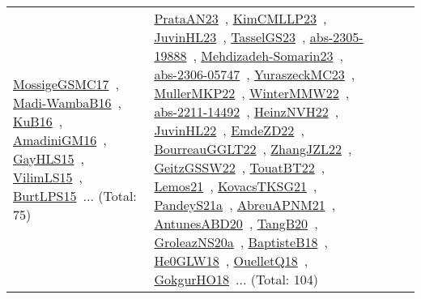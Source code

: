 {\begin{longtable}{lp{3cm}>{\raggedright\arraybackslash}p{6cm}>{\raggedright\arraybackslash}p{6cm}>{\raggedright\arraybackslash}p{8cm}}
\href{works/MossigeGSMC17.pdf}{MossigeGSMC17}~\cite{MossigeGSMC17}, \href{works/Madi-WambaB16.pdf}{Madi-WambaB16}~\cite{Madi-WambaB16}, \href{works/KuB16.pdf}{KuB16}~\cite{KuB16}, \href{works/AmadiniGM16.pdf}{AmadiniGM16}~\cite{AmadiniGM16}, \href{works/GayHLS15.pdf}{GayHLS15}~\cite{GayHLS15}, \href{works/VilimLS15.pdf}{VilimLS15}~\cite{VilimLS15}, \href{works/BurtLPS15.pdf}{BurtLPS15}~\cite{BurtLPS15}... (Total: 75) & \href{works/PrataAN23.pdf}{PrataAN23}~\cite{PrataAN23}, \href{works/KimCMLLP23.pdf}{KimCMLLP23}~\cite{KimCMLLP23}, \href{works/JuvinHL23.pdf}{JuvinHL23}~\cite{JuvinHL23}, \href{works/TasselGS23.pdf}{TasselGS23}~\cite{TasselGS23}, \href{works/abs-2305-19888.pdf}{abs-2305-19888}~\cite{abs-2305-19888}, \href{works/Mehdizadeh-Somarin23.pdf}{Mehdizadeh-Somarin23}~\cite{Mehdizadeh-Somarin23}, \href{works/abs-2306-05747.pdf}{abs-2306-05747}~\cite{abs-2306-05747}, \href{works/YuraszeckMC23.pdf}{YuraszeckMC23}~\cite{YuraszeckMC23}, \href{works/MullerMKP22.pdf}{MullerMKP22}~\cite{MullerMKP22}, \href{works/WinterMMW22.pdf}{WinterMMW22}~\cite{WinterMMW22}, \href{works/abs-2211-14492.pdf}{abs-2211-14492}~\cite{abs-2211-14492}, \href{works/HeinzNVH22.pdf}{HeinzNVH22}~\cite{HeinzNVH22}, \href{works/JuvinHL22.pdf}{JuvinHL22}~\cite{JuvinHL22}, \href{works/EmdeZD22.pdf}{EmdeZD22}~\cite{EmdeZD22}, \href{works/BourreauGGLT22.pdf}{BourreauGGLT22}~\cite{BourreauGGLT22}, \href{works/ZhangJZL22.pdf}{ZhangJZL22}~\cite{ZhangJZL22}, \href{works/GeitzGSSW22.pdf}{GeitzGSSW22}~\cite{GeitzGSSW22}, \href{works/TouatBT22.pdf}{TouatBT22}~\cite{TouatBT22}, \href{works/Lemos21.pdf}{Lemos21}~\cite{Lemos21}, \href{works/KovacsTKSG21.pdf}{KovacsTKSG21}~\cite{KovacsTKSG21}, \href{works/PandeyS21a.pdf}{PandeyS21a}~\cite{PandeyS21a}, \href{works/AbreuAPNM21.pdf}{AbreuAPNM21}~\cite{AbreuAPNM21}, \href{works/AntunesABD20.pdf}{AntunesABD20}~\cite{AntunesABD20}, \href{works/TangB20.pdf}{TangB20}~\cite{TangB20}, \href{works/GroleazNS20a.pdf}{GroleazNS20a}~\cite{GroleazNS20a}, \href{works/BaptisteB18.pdf}{BaptisteB18}~\cite{BaptisteB18}, \href{works/He0GLW18.pdf}{He0GLW18}~\cite{He0GLW18}, \href{works/OuelletQ18.pdf}{OuelletQ18}~\cite{OuelletQ18}, \href{works/GokgurHO18.pdf}{GokgurHO18}~\cite{GokgurHO18}... (Total: 104)\\

\end{longtable}}

